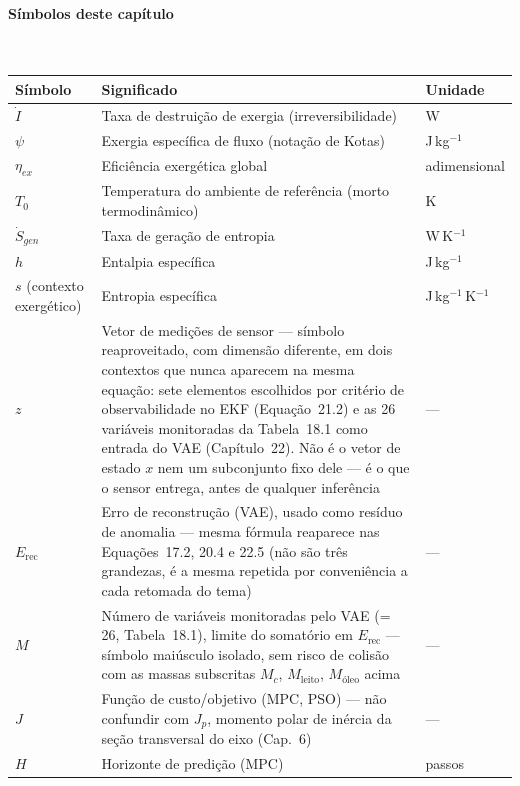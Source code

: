\documentclass[12pt,a4paper]{article}
\numberwithin{equation}{section}
\numberwithin{table}{section}
\numberwithin{figure}{section}
\begin{document}
{\paragraph{Símbolos deste capítulo}\mbox{}\\[-0.5em]
{\small
\begin{longtable}{>{\raggedright\arraybackslash}p{2.6cm} >{\raggedright\arraybackslash}p{9.2cm} >{\raggedright\arraybackslash}p{2.6cm}}
	\toprule
	\textbf{Símbolo} & \textbf{Significado} & \textbf{Unidade} \\ \midrule
	\endhead
	$\dot{I}$ & Taxa de destruição de exergia (irreversibilidade) & W \\
	$\psi$\dag & Exergia específica de fluxo (notação de Kotas) & J\,kg$^{-1}$ \\
	$\eta_{ex}$ & Eficiência exergética global & adimensional \\
	$T_0$ & Temperatura do ambiente de referência (morto termodinâmico) & K \\
	$\dot{S}_{gen}$ & Taxa de geração de entropia & W\,K$^{-1}$ \\
	$h$ & Entalpia específica & J\,kg$^{-1}$ \\
	$s$ (contexto exergético) & Entropia específica & J\,kg$^{-1}$\,K$^{-1}$ \\
	$z$ & Vetor de medições de sensor — símbolo reaproveitado, com dimensão diferente, em dois contextos que nunca aparecem na mesma equação: sete elementos escolhidos por critério de observabilidade no EKF (Equação~21.2) e as 26 variáveis monitoradas da Tabela~18.1 como entrada do VAE (Capítulo~22). Não é o vetor de estado $x$ nem um subconjunto fixo dele — é o que o sensor entrega, antes de qualquer inferência & --- \\
	$E_{\text{rec}}$ & Erro de reconstrução (VAE), usado como resíduo de anomalia — mesma fórmula reaparece nas Equações~17.2, 20.4 e 22.5 (não são três grandezas, é a mesma repetida por conveniência a cada retomada do tema) & --- \\
	$M$ & Número de variáveis monitoradas pelo VAE (= 26, Tabela~18.1), limite do somatório em $E_{\text{rec}}$ — símbolo maiúsculo isolado, sem risco de colisão com as massas subscritas $M_c$, $M_{\text{leito}}$, $M_{\text{óleo}}$ acima & --- \\
	$J$ & Função de custo/objetivo (MPC, PSO) — não confundir com $J_p$, momento polar de inércia da seção transversal do eixo (Cap.~6) & --- \\
	$H$ & Horizonte de predição (MPC) & passos \\
	\bottomrule
\end{longtable}
}






}
\end{document}
